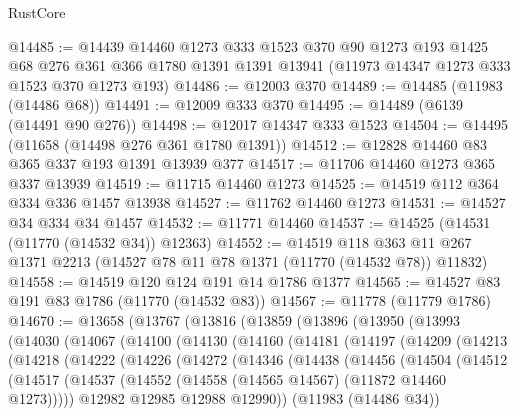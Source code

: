 \begin{lexlean}{RustCore}
\begin{coremodule}
@14485 := @14439
    @14460
    @1273
    @333
    @1523
    @370
    @90
    @1273
    @193
    @1425
    @68
    @276
    @361
    @366
    @1780
    @1391
    @1391
    @13941
    (@11973 @14347 @1273 @333 @1523 @370 @1273 @193)
@14486 := @12003 @370
@14489 := @14485 (@11983 (@14486 @68))
@14491 := @12009 @333 @370
@14495 := @14489 (@6139 (@14491 @90 @276))
@14498 := @12017 @14347 @333 @1523
@14504 := @14495 (@11658 (@14498 @276 @361 @1780 @1391))
@14512 := @12828 @14460 @83 @365 @337 @193 @1391 @13939 @377
@14517 := @11706 @14460 @1273 @365 @337 @13939
@14519 := @11715 @14460 @1273
@14525 := @14519 @112 @364 @334 @336 @1457 @13938
@14527 := @11762 @14460 @1273
@14531 := @14527 @34 @334 @34 @1457
@14532 := @11771 @14460
@14537 := @14525 (@14531 (@11770 (@14532 @34)) @12363)
@14552 := @14519
    @118
    @363
    @11
    @267
    @1371
    @2213
    (@14527 @78 @11 @78 @1371 (@11770 (@14532 @78)) @11832)
@14558 := @14519 @120 @124 @191 @14 @1786 @1377
@14565 := @14527 @83 @191 @83 @1786 (@11770 (@14532 @83))
@14567 := @11778 (@11779 @1786)
@14670 := @13658
    (@13767
      (@13816
        (@13859
          (@13896
            (@13950
              (@13993
                (@14030
                  (@14067
                    (@14100
                      (@14130
                        (@14160
                          (@14181
                            (@14197
                              (@14209
                                (@14213
                                  (@14218
                                    (@14222
                                      (@14226
                                        (@14272
                                          (@14346
                                            (@14438
                                              (@14456
                                                (@14504
                                                  (@14512
                                                    (@14517
                                                      (@14537
                                                        (@14552
                                                          (@14558
                                                            (@14565 @14567)
                                                            (@11872 @14460 @1273)))))
                                                    @12982
                                                    @12985
                                                    @12988
                                                    @12990))
                                                (@11983 (@14486 @34))

\end{coremodule}
\end{lexlean}
